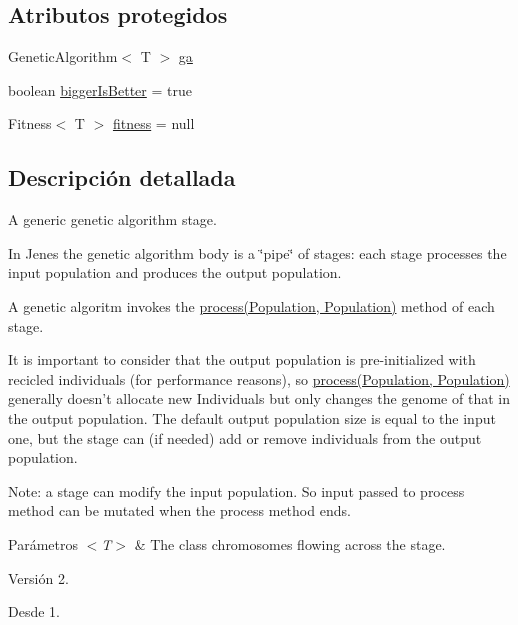 \subsection*{Atributos protegidos}
\begin{DoxyCompactItemize}
\item 
Genetic\-Algorithm$<$ T $>$ \hyperlink{classjenes_1_1stage_1_1_abstract_stage_3_01_t_01extends_01_chromosome_01_4_a751aba4f46b29d22592d48422ffa75f9}{ga}
\item 
boolean \hyperlink{classjenes_1_1stage_1_1_abstract_stage_3_01_t_01extends_01_chromosome_01_4_a11da35af3fe950eef9882b03e13690d4}{bigger\-Is\-Better} = true
\item 
Fitness$<$ T $>$ \hyperlink{classjenes_1_1stage_1_1_abstract_stage_3_01_t_01extends_01_chromosome_01_4_a697ab8239c1ae2a99445cd7f5fbca45d}{fitness} = null
\end{DoxyCompactItemize}


\subsection{Descripción detallada}
A generic genetic algorithm stage.\par
 \par
 In Jenes the genetic algorithm body is a \char`\"{}pipe\char`\"{} of stages\-: each stage processes the input population and produces the output population.\par
 A genetic algoritm invokes the \hyperlink{}{process(\-Population, Population)} method of each stage. \par
 It is important to consider that the output population is pre-\/initialized with recicled individuals (for performance reasons), so \hyperlink{}{process(\-Population, Population)} generally doesn't allocate new Individuals but only changes the genome of that in the output population. The default output population size is equal to the input one, but the stage can (if needed) add or remove individuals from the output population. \par
\par
 Note\-: a stage can modify the input population. So input passed to process method can be mutated when the process method ends.


\begin{DoxyParams}{Parámetros}
{\em $<$\-T$>$} & The class chromosomes flowing across the stage.\\
\hline
\end{DoxyParams}
\begin{DoxyVersion}{Versión}
2. 
\end{DoxyVersion}
\begin{DoxySince}{Desde}
1. 
\end{DoxySince}


